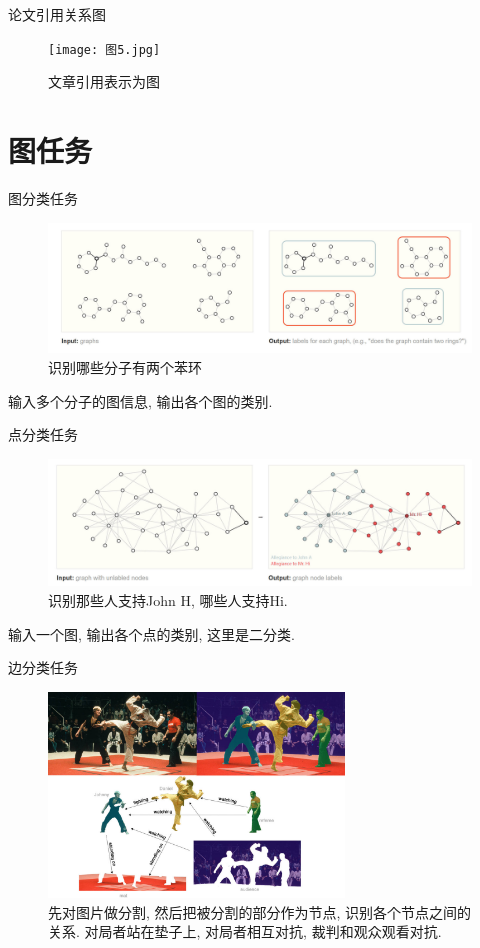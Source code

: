 \documentclass{beamer}
\begin{document}
\begin{frame}{论文引用关系图}
    \begin{figure}
        \texttt{[image: 图5.jpg]}
        \caption{文章引用表示为图}
    \end{figure}
\end{frame}

\section{图任务}

\begin{frame}{图分类任务}
    \begin{figure}
        \includegraphics[width=\textwidth]{全局分类.jpg}
        \caption{识别哪些分子有两个苯环}
    \end{figure}
    输入多个分子的图信息, 输出各个图的类别.
\end{frame}

\begin{frame}{点分类任务}
    \begin{figure}
        \includegraphics[width=\textwidth]{点分类.jpg}
        \caption{识别那些人支持John H, 哪些人支持Hi. }
    \end{figure}
    输入一个图, 输出各个点的类别, 这里是二分类.
\end{frame}

\begin{frame}{边分类任务}
    \begin{figure}
        \includegraphics[width=0.7\textwidth]{边分类.jpg}
        \caption{先对图片做分割, 然后把被分割的部分作为节点, 识别各个节点之间的关系. 对局者站在垫子上, 对局者相互对抗, 裁判和观众观看对抗. }
    \end{figure}
\end{frame}
\end{document}
